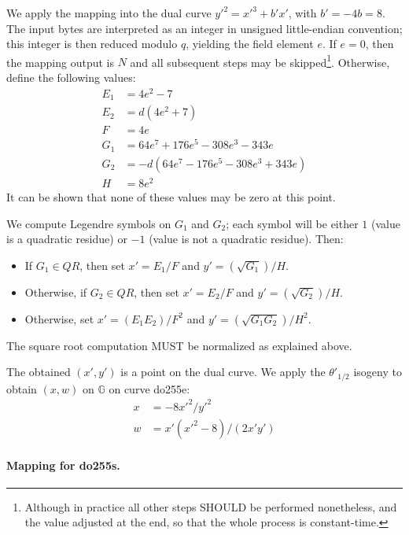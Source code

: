\documentclass{llncs}
\newcommand{\QR}{QR}
\newcommand{\bG}{\mathbb{G}}
\begin{document}
We apply the mapping into the dual curve $y'^2 = x'^3 + b' x'$, with
$b' = -4b = 8$. The input bytes are interpreted as an integer in
unsigned little-endian convention; this integer is then reduced modulo
$q$, yielding the field element $e$. If $e = 0$, then the mapping output
is $N$ and all subsequent steps may be skipped\footnote{Although in
practice all other steps SHOULD be performed nonetheless, and the value
adjusted at the end, so that the whole process is constant-time.}.
Otherwise, define the following values:
\begin{align*}
    E_1 &= 4 e^2 - 7 \\
    E_2 & = d(4 e^2 + 7) \\
    F &= 4 e \\
    G_1 &= 64 e^7 + 176 e^5 - 308 e^3 - 343 e \\
    G_2 &= -d(64 e^7 - 176 e^5 - 308 e^3 + 343 e) \\
    H &= 8 e^2
\end{align*}
It can be shown that none of these values may be zero at this point.

We compute Legendre symbols on $G_1$ and $G_2$; each symbol will be either
$1$ (value is a quadratic residue) or $-1$ (value is not a quadratic
residue). Then:
\begin{itemize}
    \item If $G_1 \in \QR$, then set $x' = E_1 / F$ and $y' = (\sqrt{G_1}) / H$.
    \item Otherwise, if $G_2 \in \QR$, then set $x' = E_2 / F$ and
    $y' = (\sqrt{G_2}) / H$.
    \item Otherwise, set $x' = (E_1 E_2) / F^2$ and
    $y' = (\sqrt{G_1 G_2}) / H^2$.
\end{itemize}
The square root computation MUST be normalized as explained above.

The obtained $(x', y')$ is a point on the dual curve. We apply the
$\theta'_{1/2}$ isogeny to obtain $(x, w)$ on $\bG$ on curve do255e:
\begin{align*}
    x &= -8 x'^2 / y'^2 \\
    w &= x'(x'^2 - 8) / (2 x' y')
\end{align*}

\paragraph{Mapping for do255s.} 
\end{document}
